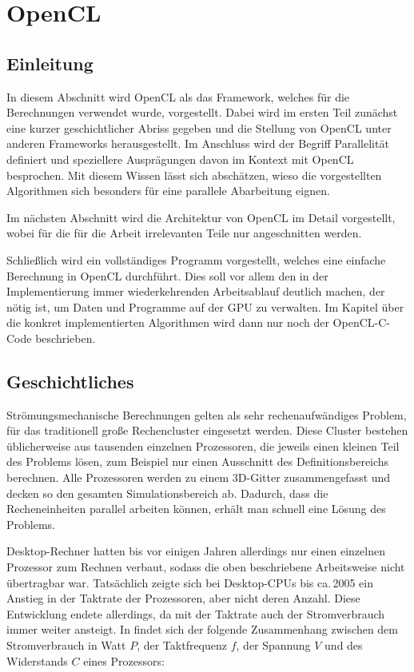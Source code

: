 \section{OpenCL}
\label{sec:opencl}

\subsection{Einleitung}

In diesem Abschnitt wird OpenCL als das Framework, welches für die Berechnungen
verwendet wurde, vorgestellt. Dabei wird im ersten Teil zunächst eine kurzer
geschichtlicher Abriss gegeben und die Stellung von OpenCL unter anderen
Frameworks herausgestellt. Im Anschluss wird der Begriff Parallelität definiert
und speziellere Ausprägungen davon im Kontext mit OpenCL besprochen. Mit diesem
Wissen lässt sich abschätzen, wieso die vorgestellten Algorithmen sich besonders
für eine parallele Abarbeitung eignen.

Im nächsten Abschnitt wird die Architektur von OpenCL im Detail vorgestellt,
wobei für die für die Arbeit irrelevanten Teile nur angeschnitten werden.

Schließlich wird ein vollständiges Programm vorgestellt, welches eine einfache
Berechnung in OpenCL durchführt. Dies soll vor allem den in der Implementierung
immer wiederkehrenden Arbeitsablauf deutlich machen, der nötig ist, um Daten und
Programme auf der GPU zu verwalten. Im Kapitel über die konkret implementierten
Algorithmen wird dann nur noch der OpenCL-C-Code beschrieben.

\subsection{Geschichtliches}

Strömungsmechanische Berechnungen gelten als sehr rechenaufwändiges
Problem, für das traditionell große Rechencluster eingesetzt werden.
Diese Cluster bestehen üblicherweise aus tausenden einzelnen
Prozessoren, die jeweils einen kleinen Teil des Problems lösen, zum
Beispiel nur einen Ausschnitt des Definitionsbereichs berechnen. Alle
Prozessoren werden zu einem 3D-Gitter zusammengefasst und decken so
den gesamten Simulationsbereich ab. Dadurch, dass die Recheneinheiten
parallel arbeiten können, erhält man schnell eine Lösung des Problems.

Desktop-Rechner hatten bis vor einigen Jahren allerdings nur einen
einzelnen Prozessor zum Rechnen verbaut, sodass die oben beschriebene
Arbeitsweise nicht übertragbar war. Tatsächlich zeigte sich bei
Desktop-CPUs bis ca.\,2005 ein Anstieg in der Taktrate der
Prozessoren, aber nicht deren Anzahl. Diese Entwicklung endete allerdings, da mit
der Taktrate auch der Stromverbrauch immer weiter ansteigt. In
\cite{Chandrakasan1995} findet sich der folgende Zusammenhang zwischen
dem Stromverbrauch in Watt $P$, der Taktfrequenz $f$, der Spannung $V$ und
des Widerstands $C$ eines Prozessors:

